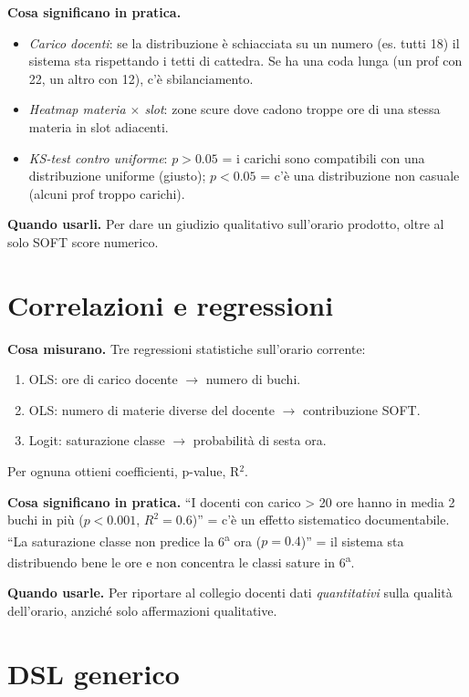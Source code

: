 \textbf{Cosa significano in pratica.}
\begin{itemize}
\item \emph{Carico docenti}: se la distribuzione \`e
  schiacciata su un numero (es. tutti 18) il sistema sta
  rispettando i tetti di cattedra. Se ha una coda lunga (un
  prof con 22, un altro con 12), c'\`e sbilanciamento.
\item \emph{Heatmap materia $\times$ slot}: zone scure dove
  cadono troppe ore di una stessa materia in slot adiacenti.
\item \emph{KS-test contro uniforme}: $p > 0.05$ = i carichi
  sono compatibili con una distribuzione uniforme (giusto);
  $p < 0.05$ = c'\`e una distribuzione non casuale (alcuni
  prof troppo carichi).
\end{itemize}

\textbf{Quando usarli.} Per dare un giudizio qualitativo
sull'orario prodotto, oltre al solo SOFT score numerico.

\section{Correlazioni e regressioni}

\textbf{Cosa misurano.} Tre regressioni statistiche
sull'orario corrente:
\begin{enumerate}
\item OLS: ore di carico docente $\to$ numero di buchi.
\item OLS: numero di materie diverse del docente $\to$
  contribuzione SOFT.
\item Logit: saturazione classe $\to$ probabilit\`a di sesta
  ora.
\end{enumerate}

Per ognuna ottieni coefficienti, p-value, R$^2$.

\textbf{Cosa significano in pratica.} ``I docenti con carico
> 20 ore hanno in media 2 buchi in pi\`u ($p < 0.001$,
$R^2 = 0.6$)'' = c'\`e un effetto sistematico documentabile.
``La saturazione classe non predice la 6\textsuperscript{a}
ora ($p = 0.4$)'' = il sistema sta distribuendo bene le ore
e non concentra le classi sature in 6\textsuperscript{a}.

\textbf{Quando usarle.} Per riportare al collegio docenti
dati \emph{quantitativi} sulla qualit\`a dell'orario, anzich\'e
solo affermazioni qualitative.

\section{DSL generico}

